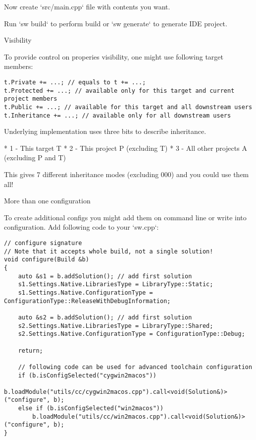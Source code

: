 Now create `src/main.cpp` file with contents you want.

Run `sw build` to perform build or `sw generate` to generate IDE project.



Visibility

To provide control on properies visibility, one might use following target members:

\begin{verbatim}
t.Private += ...; // equals to t += ...;
t.Protected += ...; // available only for this target and current project members
t.Public += ...; // available for this target and all downstream users
t.Inheritance += ...; // available only for all downstream users
\end{verbatim}

Underlying implementation uses three bits to describe inheritance.

* 1 - This target T
* 2 - This project P (excluding T)
* 3 - All other projects A (excluding P and T)

This gives 7 different inheritance modes (excluding 000) and you could use them all!





More than one configuration

To create additional configs you might add them on command line or write into configuration.
Add following code to your `sw.cpp`:

\begin{verbatim}
// configure signature
// Note that it accepts whole build, not a single solution!
void configure(Build &b)
{
    auto &s1 = b.addSolution(); // add first solution
    s1.Settings.Native.LibrariesType = LibraryType::Static;
    s1.Settings.Native.ConfigurationType = ConfigurationType::ReleaseWithDebugInformation;

    auto &s2 = b.addSolution(); // add first solution
    s2.Settings.Native.LibrariesType = LibraryType::Shared;
    s2.Settings.Native.ConfigurationType = ConfigurationType::Debug;

    return;

    // following code can be used for advanced toolchain configuration
    if (b.isConfigSelected("cygwin2macos"))
        b.loadModule("utils/cc/cygwin2macos.cpp").call<void(Solution&)>("configure", b);
    else if (b.isConfigSelected("win2macos"))
        b.loadModule("utils/cc/win2macos.cpp").call<void(Solution&)>("configure", b);
}
\end{verbatim}


